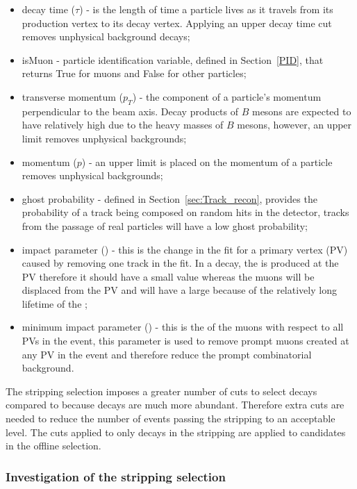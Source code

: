 \begin{itemize}
\item decay time ($\tau$) - is the length of time a particle lives as it travels from its production vertex to its decay vertex. Applying an upper decay time cut removes unphysical background decays;
\item isMuon - particle identification variable, defined in Section~\ref{PID}, that returns True for muons and False for other particles;
\item transverse momentum ($p_{T}$) - the component of a particle's momentum perpendicular to the beam axis. Decay products of $B$ mesons are expected to have relatively high \pt due to the heavy masses of $B$ mesons, however, an upper limit removes unphysical backgrounds;
\item momentum ($p$) - an upper limit is placed on the momentum of a particle  removes unphysical backgrounds;
\item ghost probability - defined in Section~\ref{sec:Track_recon}, provides the probability of a track being composed on random hits in the detector, tracks from the passage of real particles will have a low ghost probability; 
\item impact parameter \chisqd (\chiIP) - this is the change in the fit \chisqd for a primary vertex (PV) caused by removing one track in the fit. In a \bsmumu decay, the \bsd is produced at the PV therefore it should have a small \chiIP value whereas the muons will be displaced from the PV and will have a large \chiIP because of the relatively long lifetime of the \bsd;
\item minimum impact parameter (\chiIP) - this is the \chiIP  of the muons with respect to all PVs in the event, this parameter is used to remove prompt muons created at any PV in the event and therefore reduce the prompt combinatorial background. 
\end{itemize}

The stripping selection imposes a greater number of cuts to select \bhh decays compared to \bsmumu because \bhh decays are much more abundant. Therefore extra cuts are needed to reduce the number of events passing the stripping to an acceptable level. The cuts applied to only \bhh decays in the stripping are applied to \bsmumu candidates in the offline selection. %


\subsubsection{Investigation of the stripping selection}
\label{strippingstudies}

